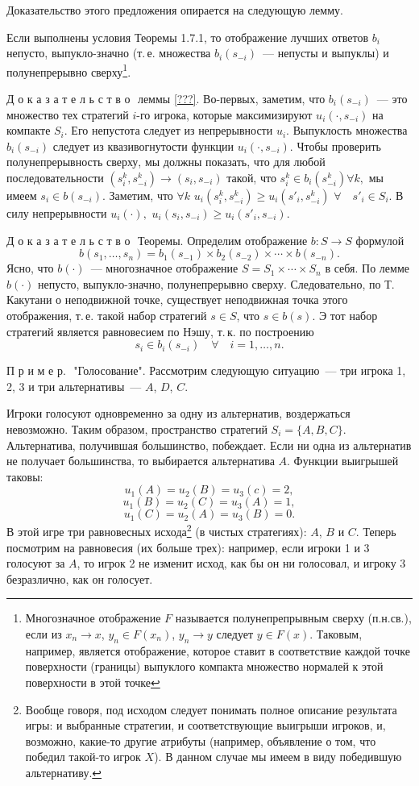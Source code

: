 {Доказательство этого предложения опирается на следующую лемму.

\begin{lemma} \label{???}
Если выполнены условия Теоремы 1.7.1, то отображение лучших ответов
$b_i$ непусто, выпукло-значно (т.\,е. множества $b_i(s_{-i})$~---
непусты и выпуклы) и полунепрерывно сверху\footnote{ Многозначное
отображение $F$ называется полунепрепрывным сверху (п.н.св.), если
из $x_n\to x$, $y_n\in F(x_n)$, $y_n\to y$ следует $y\in F(x)$.
Таковым, например, является отображение, которое ставит в соответствие
каждой точке поверхности (границы) выпуклого компакта множество нормалей
к этой поверхности в этой точке}.
\end{lemma}

Д о к а з а т е л ь с т в о\,\, леммы \ref{???}. Во-первых,
заметим, что $b_i(s_{-i})$~---  это множество тех стратегий $i$-го
игрока, которые максимизируют $u_i(\cdot,s_{-i})$ на компакте $S_i.$
Его непустота следует из непрерывности $u_i.$ Выпуклость множества
$b_i(s_{-i})$ следует из квазивогнутости функции
$u_i(\cdot,s_{-i}).$ Чтобы проверить полунепрерывность сверху, мы
должны показать, что для любой последовательности $(s^k_i,s^k_{- i})
\to(s_i,s_{-i})$ такой, что $s^k_i\in b_i(s^k_{-i})\forall k,$ мы
имеем $s_i\in b(s_{-i})$. Заметим, что $\forall k$
$u_i(s^k_i,s^k_{-i})\ge u_i(s'_i,s^k_{-i})$ $\forall\quad s'_i \in
S_i$. В силу непрерывности $u_i(\cdot),$ $u_i(s_i,s_{-i})\ge
u_i(s'_i, s_{-i})$.

Д о к а з а т е л ь с т в о\,\,  Теоремы. Определим отображение
$b:S\to S$ формулой
$$
b(s_1,\ldots,s_n)=b_1(s_{-1})\times b_2(s_{-2})\times\cdots\times
b(s_{-n}).
$$
Ясно, что $b(\cdot)$~--- многозначное отображение
$S=S_1\times\cdots\times S_n$ в себя. По лемме $b(\cdot)$ непусто,
выпукло-значно, полунепрерывно сверху. Следовательно, по
Т.\,Какутани о неподвижной точке, существует неподвижная точка
этого отображения, т.\,е. такой набор стратегий $s\in S$, что $s\in b(s)$. Э
тот набор стратегий является равновесием по Нэшу, т.\,к. по построению
$$
s_i\in b_i(s_{-i})\quad\forall\quad i=1,\ldots,n.
$$
\smallskip

П р и м е р.\,\, "Голосование". Рассмотрим следующую ситуацию~---
три игрока 1, 2, 3 и три альтернативы~--- $A$, $D$, $C$.

Игроки голосуют одновременно за одну из альтернатив, воздержаться
невозможно. Таким образом, пространство стратегий $S_i=\{A,B,C\}$.
Альтернатива, получившая большинство, побеждает.  Если ни одна из
альтернатив не получает большинства, то выбирается альтернатива $A$.
Функции выигрышей таковы:
$$
u_1(A)=u_2(B)=u_3(c)=2,
$$
$$
u_1(B)=u_2(C)=u_3(A)=1,
$$
$$
u_1(C)=u_2(A)=u_3(B)=0.
$$
В этой игре три равновесных исхода\footnote{ Вообще говоря, под
исходом следует понимать полное описание результата игры: и
выбранные стратегии, и соответствующие выигрыши игроков, и,
возможно, какие-то другие атрибуты (например, объявление о том, что
победил такой-то игрок $X$). В данном случае мы имеем в виду
победившую альтернативу.} (в чистых стратегиях): $A$, $B$  и $C$.
Теперь посмотрим на равновесия (их больше трех): например, если игроки 1 и 3
голосуют за $A$, то игрок 2 не изменит исход, как бы он ни
голосовал, и игроку 3 безразлично, как он голосует.

}
